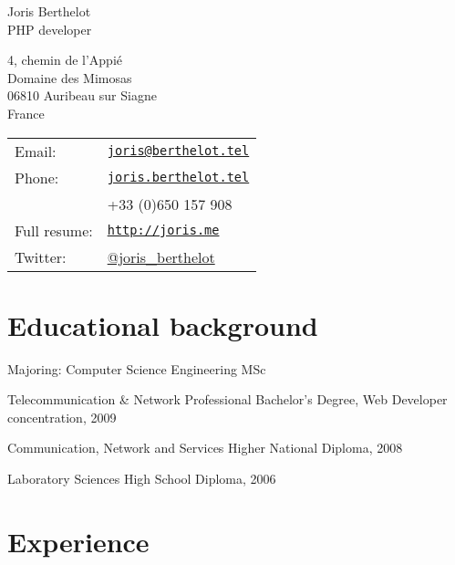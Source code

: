 \documentclass[letterpaper]{article}
\def\name{Joris Berthelot}
\def\title{PHP developer}
\renewenvironment{itemize}{
    \begin{list}{}{
        \setlength{\leftmargin}{1.5em}
    }
}{
    \end{list}
}
\begin{document}
    
    {\Huge \name} \\
    {\Large \title}
    
    
    \vspace{0.25in}
    
    \begin{minipage}{0.65\linewidth}
        4, chemin de l'Appi\'e \\
        Domaine des Mimosas \\
        06810 Auribeau sur Siagne \\
        France
    \end{minipage}
    \begin{minipage}{0.5\linewidth}
        \begin{tabular}{ll}
            Email: & \href{mailto:joris@berthelot.tel}{\tt joris@berthelot.tel} \\
            Phone: & \href{http://joris.berthelot.tel}{\tt joris.berthelot.tel} \\
                   & +33 (0)650 157 908 \\
            Full resume: & \href{http://joris.me}{\tt http://joris.me} \\
            Twitter: & \href{http://twitter.com/joris_berthelot}{@joris\_berthelot}
        \end{tabular}
    \end{minipage}
    
    \section*{Educational background}
        
        \begin{itemize}
            \item Majoring: Computer Science Engineering MSc
            \item Telecommunication \& Network Professional Bachelor's Degree, Web Developer concentration, 2009
            \item Communication, Network and Services Higher National Diploma, 2008
            \item Laboratory Sciences High School Diploma, 2006
        \end{itemize}
        
    \section*{Experience}
        
\end{document}
